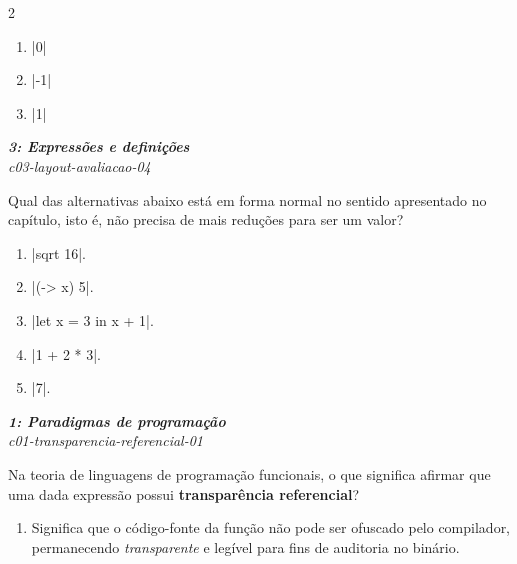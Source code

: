 \documentclass[a4paper,10pt,brazil]{article}
\begin{document}
\begin{multicols}{2}
\begin{enumerate}
  \item \haskellinline|0|

  \item \haskellinline|-1|

  \item \haskellinline|1|


\end{enumerate}

\begin{flushright}
  \footnotesize
  \textit{\textbf{3: Expressões e definições}}\\
  \textit{c03-layout-avaliacao-04}\\

\end{flushright}
Qual das alternativas abaixo está em forma normal no sentido apresentado no capítulo, isto é, não precisa de mais reduções para ser um valor?

\begin{enumerate}
  \item \haskellinline|sqrt 16|.

  \item \haskellinline|(\x -> x) 5|.

  \item \haskellinline|let x = 3 in x + 1|.

  \item \haskellinline|1 + 2 * 3|.

  \item \haskellinline|7|.


\end{enumerate}

\begin{flushright}
  \footnotesize
  \textit{\textbf{1: Paradigmas de programação}}\\
  \textit{c01-transparencia-referencial-01}\\

\end{flushright}
Na teoria de linguagens de programação funcionais, o que significa afirmar que uma dada expressão possui \textbf{transparência referencial}?

\begin{enumerate}
  \item Significa que o código-fonte da função não pode ser ofuscado pelo compilador, permanecendo \emph{transparente} e legível para fins de auditoria no binário.


\end{enumerate}
\end{multicols}
\end{document}
